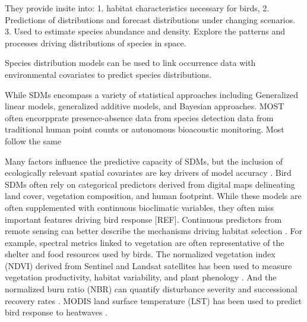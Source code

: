 \documentclass[remotesensing, aricle,submit,moreauthors]{Definitions/mdpi}
\begin{document}
They provide insite into:
1. habitat characteristics necessary for birds,
2. Predictions of distributions and forecast distributions under changing scenarios.
3. Used to estimate species abundance and density.
Explore the patterns and processes driving distributions of species in space.

Species distribution models can be used to link occurrence data with environmental covariates to predict species distributions.

While SDMs encompass a variety of statistical approaches including Generalized linear models, generalized additive models, and Bayesian approaches. MOST often encorpprate presence-absence data from species detection data from traditional human point counts or autonomous bioacoustic monitoring. Most follow the same

Many factors influence the predictive capacity of SDMs, but the inclusion of ecologically relevant spatial covariates are key drivers of model accuracy \citep{Franklin1995, Vaughn2003, fourcadePaintingsPredictDistribution2018}. Bird SDMs often rely on categorical predictors derived from digital maps delineating land cover, vegetation composition, and human footprint. While these models are often supplemented with continuous bioclimatic variables, they often miss important features driving bird response {[}REF{]}.
Continuous predictors from remote sensing can better describe the mechanisms driving habitat selection \citep{heWillRemoteSensing2015}. For example, spectral metrics linked to vegetation are often representative of the shelter and food resources used by birds. The normalized vegetation index (NDVI) derived from Sentinel and Landsat satellites has been used to measure vegetation productivity, habitat variability, and plant phenology \citep{pettorelliNormalizedDifferenceVegetation2011}. And the normalized burn ratio (NBR) can quantify disturbance severity and successional recovery rates \citep{hislopUsingLandsatSpectral2018}. MODIS land surface temperature (LST) has been used to predict bird response to heatwaves \citep{albrightHeatWavesMeasured2011}.
\end{document}
